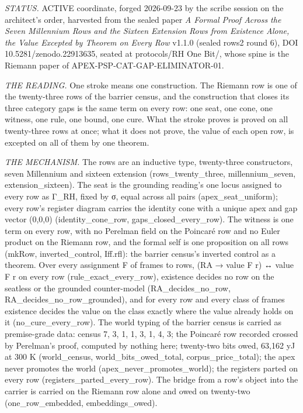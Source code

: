 \documentclass[10pt,twocolumn]{article}
\begin{document}
\emph{STATUS.} ACTIVE coordinate, forged 2026-09-23 by the scribe
session on the architect's order, harvested from the sealed paper
\emph{A Formal Proof Across the Seven Millennium Rows and the Sixteen
Extension Rows from Existence Alone, the Value Excepted by Theorem on
Every Row} v1.1.0 (sealed rows2 round 6), DOI 10.5281/zenodo.22913635,
seated at protocols/RH One Bit/, whose spine is the Riemann paper of
APEX-PSP-CAT-GAP-ELIMINATOR-01.

\emph{THE READING.} One stroke means one construction. The Riemann row
is one of the twenty-three rows of the barrier census, and the
construction that closes its three category gaps is the same term on
every row: one seat, one cone, one witness, one rule, one bound, one
cure. What the stroke proves is proved on all twenty-three rows at once;
what it does not prove, the value of each open row, is excepted on all
of them by one theorem.

\emph{THE MECHANISM.} The rows are an inductive type, twenty-three
constructors, seven Millennium and sixteen extension
(rows\_twenty\_three, millennium\_seven, extension\_sixteen). The seat
is the grounding reading's one locus assigned to every row as Γ\_RH,
fixed by σ, equal across all pairs (apex\_seat\_uniform); every row's
register diagram carries the identity cone with a unique apex and gap
vector (0,0,0) (identity\_cone\_row, gaps\_closed\_every\_row). The
witness is one term on every row, with no Perelman field on the Poincaré
row and no Euler product on the Riemann row, and the formal self is one
proposition on all rows (mkRow, inverted\_control, Iff.rfl): the barrier
census's inverted control as a theorem. Over every assignment F of
frames to rows, (RA → value F r) ↔ value F r on every row
(rule\_exact\_every\_row), existence decides no row on the seatless or
the grounded counter-model (RA\_decides\_no\_row,
RA\_decides\_no\_row\_grounded), and for every row and every class of
frames existence decides the value on the class exactly where the value
already holds on it (no\_cure\_every\_row). The world typing of the
barrier census is carried as premise-grade data: census 7, 3, 1, 1, 3,
1, 4, 3; the Poincaré row recorded crossed by Perelman's proof, computed
by nothing here; twenty-two bits owed, 63,162 yJ at 300 K
(world\_census, world\_bits\_owed\_total, corpus\_price\_total); the
apex never promotes the world (apex\_never\_promotes\_world); the
registers parted on every row (registers\_parted\_every\_row). The
bridge from a row's object into the carrier is carried on the Riemann
row alone and owed on twenty-two (one\_row\_embedded, embeddings\_owed).
\end{document}

